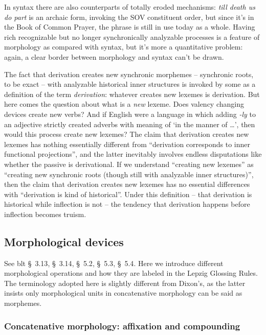 \documentclass[UTF8, a4paper, oneside, scheme=plain]{ctexart}
\newcommand*{\citesec}[1]{\S~{#1}}
\newcommand*{\term}[1]{\emph{#1}}
\newcommand*{\corpus}[1]{\emph{#1}}
\newcommand*{\translate}[1]{`#1'}
\begin{document}
In syntax there are also counterparts of totally eroded mechanisms:
\corpus{till death us do part} is an archaic form,
invoking the SOV constituent order,
but since it's in the Book of Common Prayer,
the phrase is still in use today as a whole.
Having rich recognizable but no longer synchronically analyzable processes 
is a feature of morphology as compared with syntax,
but it's more a quantitative problem:
again, a clear border between morphology and syntax can't be drawn.

The fact that derivation creates new synchronic morphemes -- synchronic roots, to be exact
-- with analyzable historical inner structures 
is invoked by some as a definition of the term \term{derivation}:
whatever creates new lexemes is derivation.
But here comes the question about what is a \emph{new} lexeme.
Does valency changing devices create new verbs?
And if English were a language 
in which adding \corpus{-ly} to an adjective
strictly created adverbs with meaning of \translate{in the manner of \dots},
then would this process create new lexemes?
The claim that derivation creates new lexemes 
has nothing essentially different from 
``derivation corresponds to inner functional projections'',
and the latter inevitably involves endless disputations like whether the passive is derivational.
If we understand ``creating new lexemes'' 
as ``creating new synchronic roots (though still with analyzable inner structures)'',
then the claim that derivation creates new lexemes
has no essential differences with ``derivation is kind of historical''.
Under this definition -- 
that derivation is historical while inflection is not --
the tendency that derivation happens before inflection becomes truism.

\subsection{Morphological devices}

See \ac{blt} \citesec{3.13}, \citesec{3.14}, \citesec{5.2}, \citesec{5.3}, \citesec{5.4}.
Here we introduce different morphological operations and how they are labeled in the Lepzig Glossing Rules. 
The terminology adopted here is slightly different from Dixon's, 
as the latter insists only morphological units in concatenative morphology can be said as morphemes.

\subsubsection{Concatenative morphology: affixation and compounding}
\end{document}
